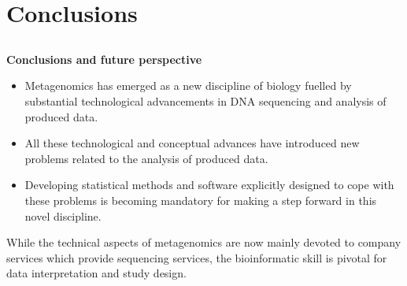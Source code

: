 \documentclass[10pt]{beamer}
\begin{document}
\section{Conclusions}
\subsection{}

\begin{frame}
	\vspace{2mm}
	\textbf{\Large{Conclusions and future perspective}}
	\vspace{2mm}	
	\small{%
	\begin{itemize}
		\item Metagenomics has emerged as a new discipline of biology fuelled by substantial technological advancements in DNA sequencing and analysis of produced data.
		\item All these technological and conceptual advances have introduced new problems related to the analysis of produced data.
		\item   Developing statistical methods and software explicitly designed to cope with these problems is becoming mandatory for making a step forward in this novel discipline.
	\end{itemize}
	\pause
	\begin{block}{}
		While the technical aspects of metagenomics are now mainly devoted to company services which provide sequencing services, the bioinformatic skill is pivotal for data interpretation and study design.
	\end{block}		
	}
\end{frame}
\end{document}
